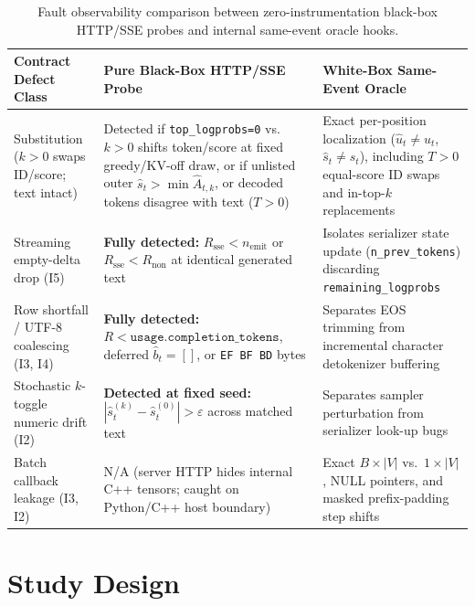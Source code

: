 \documentclass[11pt,letterpaper]{article}
\begin{document}
\begin{table}[t]
\centering
\setlength{\tabcolsep}{3.8pt}
\caption{Fault observability comparison between zero-instrumentation black-box HTTP/SSE probes and internal same-event oracle hooks.}
\label{tab:observability}
\footnotesize
\begin{tabular}{@{}>{\raggedright\arraybackslash}p{.22\linewidth}>{\raggedright\arraybackslash}p{.36\linewidth}>{\raggedright\arraybackslash}p{.35\linewidth}@{}}\toprule
Contract Defect Class & Pure Black-Box HTTP/SSE Probe & White-Box Same-Event Oracle\\\midrule
Substitution ($k>0$ swaps ID/score; text intact) & Detected if \texttt{top\_logprobs=0} vs.\ $k>0$ shifts token/score at fixed greedy/KV-off draw, or if unlisted outer $\hat{s}_t > \min \hat{A}_{t,k}$, or decoded tokens disagree with text ($T>0$) & Exact per-position localization ($\hat{u}_t \neq u_t$, $\hat{s}_t \neq s_t$), including $T>0$ equal-score ID swaps and in-top-$k$ replacements\\
Streaming empty-delta drop (\textsc{I5}) & \textbf{Fully detected:} $R_{\text{sse}} < n_{\text{emit}}$ or $R_{\text{sse}} < R_{\text{non}}$ at identical generated text & Isolates serializer state update (\texttt{n\_prev\_tokens}) discarding \texttt{remaining\_logprobs}\\
Row shortfall / UTF-8 coalescing (\textsc{I3}, \textsc{I4}) & \textbf{Fully detected:} $R < \texttt{usage.completion\_tokens}$, deferred $\hat{b}_t=[]$, or \texttt{EF BF BD} bytes & Separates EOS trimming from incremental character detokenizer buffering\\
Stochastic $k$-toggle numeric drift (\textsc{I2}) & \textbf{Detected at fixed seed:} $|\hat{s}_t^{(k)} - \hat{s}_t^{(0)}| > \varepsilon$ across matched text & Separates sampler perturbation from serializer look-up bugs\\
Batch callback leakage (\textsc{I3}, \textsc{I2}) & N/A (server HTTP hides internal C++ tensors; caught on Python/C++ host boundary) & Exact $B\times|V|$ vs.\ $1\times|V|$, NULL pointers, and masked prefix-padding step shifts\\\bottomrule
\end{tabular}
\end{table}

\section{Study Design}
\label{sec:design}
\end{document}
